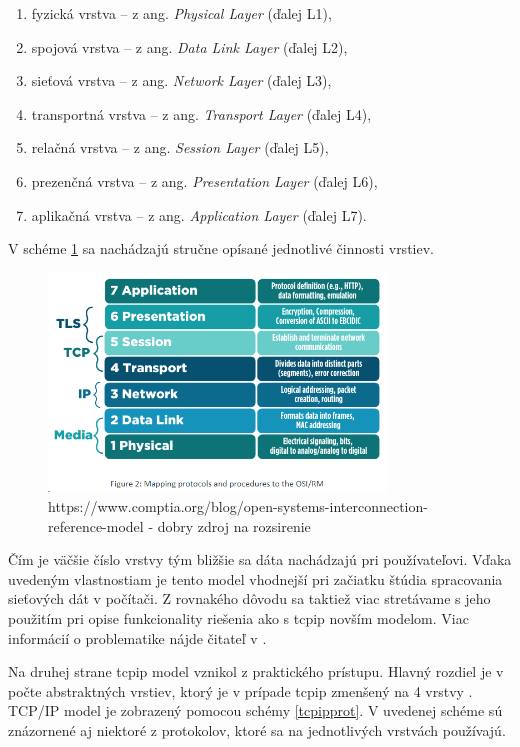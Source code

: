 \begin{enumerate}
	\item{fyzická vrstva} -- z ang. \textit{Physical Layer} (ďalej L1), 
	\item{spojová vrstva} -- z ang. \textit{Data Link Layer} (ďalej L2),
	\item{sieťová vrstva} -- z ang. \textit{Network Layer} (ďalej L3),
	\item{transportná vrstva} -- z ang. \textit{Transport Layer} (ďalej L4),
	\item{relačná vrstva} -- z ang. \textit{Session Layer} (ďalej L5),
	\item{prezenčná vrstva} -- z ang. \textit{Presentation Layer} (ďalej L6),
	\item{aplikačná vrstva} -- z ang. \textit{Application Layer} (ďalej L7).
\end{enumerate}

V schéme \ref{osi} sa nachádzajú stručne opísané jednotlivé činnosti vrstiev.
\begin{figure}[!h]
	\centering
	\includegraphics[width=0.8\textwidth]{figures/osi}
	\caption{https://www.comptia.org/blog/open-systems-interconnection-reference-model - dobry zdroj na rozsirenie}
	\label{osi}
\end{figure}


Čím je väčšie číslo vrstvy tým bližšie sa dáta nachádzajú pri používateľovi. Vďaka uvedeným vlastnostiam je tento model vhodnejší pri začiatku štúdia spracovania sieťových dát v počítači. Z rovnakého dôvodu sa taktiež viac stretávame s jeho použitím pri opise funkcionality riešenia ako s  \acrshort{tcpip} novším modelom.  Viac informácií o problematike nájde čitateľ v \cite{osi}.

Na druhej strane \acrshort{tcpip} model vznikol z praktického prístupu. Hlavný rozdiel je v počte abstraktných vrstiev, ktorý je v prípade \acrshort{tcpip} zmenšený na 4 vrstvy \cite{tcpip}. 
TCP/IP model je zobrazený pomocou schémy \ref{tcpipprot}. V uvedenej schéme sú znázornené aj niektoré z protokolov, ktoré sa na jednotlivých vrstvách používajú.

